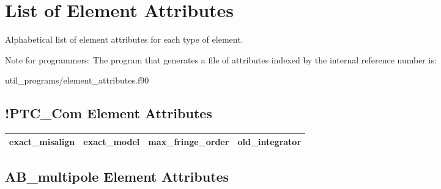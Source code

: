 \chapter{List of Element Attributes}
\label{c:attrib.list}

Alphabetical list of element attributes for each type of element. 

Note for programmers: The program that generates a file of attributes indexed by the
internal reference number is:
\begin{example}
  util_programs/element_attributes.f90 
\end{example}

 \section{!PTC_Com Element Attributes}
 \label{s:list.!ptc.com}
 
 \begin{tabular}{llll} \toprule
exact_misalign                   & exact_model                      & max_fringe_order                 & old_integrator                   \\
 \bottomrule
 \end{tabular}
 \vfill
 
 \section{AB_multipole Element Attributes}
 \label{s:list.ab.multipole}
 
